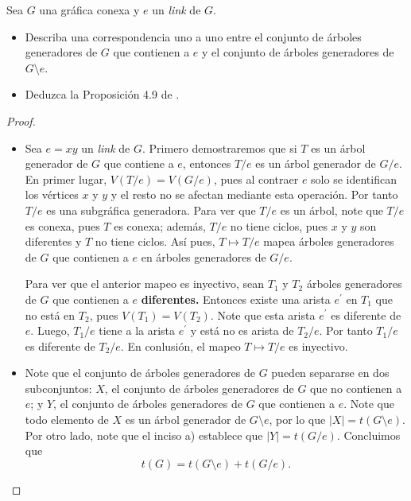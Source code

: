 \documentclass[12pt]{article}
\newenvironment{problem}[2][Problema]{\begin{trivlist}
\item[\hskip \labelsep {\bfseries #1}\hskip \labelsep {\bfseries #2.}]}{\end{trivlist}}
\begin{document}
\begin{problem}{4.2.1} Sea $G$ una gráfica conexa y $e$ un \textit{link} de $G$.
\begin{itemize}
    \item[a)] Describa una correspondencia uno a uno entre el conjunto de árboles generadores de $G$ que contienen a $e$ y el conjunto de árboles generadores de $G\setminus e$. 
    \item[b)] Deduzca la Proposición 4.9 de \cite{10.5555/1481153}.
\end{itemize}
\end{problem}
\begin{proof} \textbf{}
\begin{itemize} 
    \item[a)] Sea $e=xy$ un \textit{link} de $G.$ Primero demostraremos que si $T$ es un árbol generador de $G$ que contiene a $e$, entonces $T/e$ es un árbol generador de $G/e.$ En primer lugar, $V(T/e) = V(G/e)$, pues al contraer $e$ solo se identifican los vértices $x$ y $y$ y el resto no se afectan mediante esta operación. Por tanto $T/e$ es una subgráfica generadora. Para ver que $T/e$ es un árbol, note que $T/e$ es conexa, pues $T$ es conexa; además, $T/e$ no tiene ciclos, pues $x$ y $y$ son diferentes y $T$ no tiene ciclos. Así pues, $T \mapsto T/e$ mapea árboles generadores de $G$ que contienen a $e$ en árboles generadores de $G/e.$ 
    
    Para ver que el anterior mapeo es inyectivo, sean $T_1$ y $T_2$ árboles generadores de $G$ que contienen a $e$ \textbf{diferentes.} Entonces existe una arista $e^\prime$ en $T_1$ que no está en $T_2$, pues $V(T_1) = V(T_2).$ Note que esta arista $e^\prime$ es diferente de $e$. Luego, $T_1/e$ tiene a la arista $e^\prime$ y está no es arista de $T_2/e$. Por tanto $T_1/e$ es diferente de $T_2/e$. En conlusión, el mapeo $T \mapsto T/e$ es inyectivo.
    
    \item[b)] Note que el conjunto de árboles generadores de $G$ pueden separarse en dos subconjuntos: $X$, el conjunto de árboles generadores de $G$ que no contienen a $e$; y $Y$, el conjunto de árboles generadores de $G$ que contienen a $e$. Note que todo elemento de $X$ es un árbol generador de $G\setminus e$, por lo que $\vert X \rvert = t(G\setminus e).$ Por otro lado, note que el inciso a) establece que $\lvert Y \rvert  = t(G/e).$ Concluimos que 
    $$ t(G) = t(G\setminus e) + t(G/e).$$
    
\end{itemize}

\end{proof}
\end{document}
